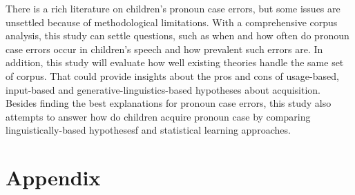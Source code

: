 \documentclass[a4paper,12pt]{article}
\begin{document}
There is a rich literature on children's pronoun case errors, but some issues are unsettled because of methodological limitations. With a comprehensive corpus analysis, this study can settle questions, such as when and how often do pronoun case errors occur in children's speech and how prevalent such errors are. In addition, this study will evaluate how well existing theories handle the same set of corpus. That could provide insights about the pros and cons of usage-based, input-based and generative-linguistics-based hypotheses about acquisition. Besides finding the best explanations for pronoun case errors, this study also attempts to answer how do children acquire pronoun case by comparing linguistically-based hypothesesf and statistical learning approaches. 

\newpage
\appendix
\section*{Appendix}


\newpage


\end{document}

